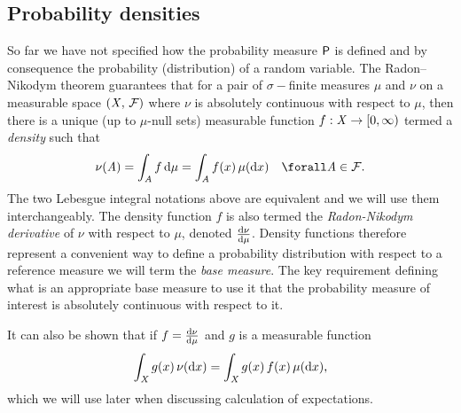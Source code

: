 \subsection{Probability densities}\label{subsec:probability-densities}

So far we have not specified how the probability measure $\mathsf{P}$ is defined and by consequence the probability (distribution) of a random variable. 
The Radon--Nikodym theorem guarantees that for a pair of $\sigma-$finite measures $\mu$ and $\nu$ on a measurable space $(\mathit{X},\,\mathcal{F})$ where $\nu$ is absolutely continuous with respect to $\mu$,  then there is a unique (up to $\mu$-null sets) measurable function $f : \mathit{X} \to [0,\infty)$ termed a \emph{density} such that
\begin{equation}\label{eq:radon-nikodym}
  \nu(\set{A}) = \int_{\set{A}} f\,\dr\mu 
  = \int_{\set{A}} f(x) \, \mu(\dr x)
  \quad \forall \set{A} \in \sset{F}.
\end{equation}
The two Lebesgue integral notations above are equivalent and we will use them interchangeably. The density function $f$ is also termed the \emph{Radon-Nikodym derivative} of $\nu$ with respect to $\mu$, denoted $\frac{\mathrm{d} \nu}{\mathrm{d} \mu}$. Density functions therefore represent a convenient way to define a probability distribution with respect to a reference measure we will term the \emph{base measure}. The key requirement defining what is an appropriate base measure to use it that the probability measure of interest is absolutely continuous with respect to it.

It can also be shown that if $f = \frac{\mathrm{d} \nu}{\mathrm{d} \mu}$ and  $g$ is a  measurable function
\begin{equation}\label{eq:integral-wrt-density}
  \int_{\mathit{X}} g(x)\,\nu(\mathrm{d} x) = \int_{\mathit{X}} g(x)\, f(x)\,\mu(\mathrm{d} x),
\end{equation}
which we will use later when discussing calculation of expectations.

